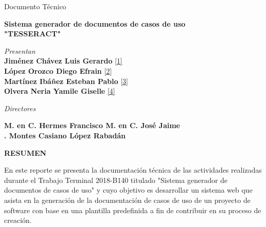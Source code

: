 \documentclass[12pt]{report}
\begin{document}
\begin{center}
	\begin{normalsize}
		Documento Técnico\\
	\end{normalsize}
	\vspace*{0.2in}	
	\begin{large}
		\textbf {Sistema generador de documentos de casos de uso\\
			"TESSERACT"}\\
	\end{large}
	\vspace*{0.2in}
	\begin{large}	
		\textit {Presentan}\\
		\textbf {Jiménez Chávez Luis Gerardo} \hyperlink{x01}{[1]}\\
		\textbf {López Orozco Diego Efrain} \hyperlink{x02}{[2]}\\
		\textbf {Martínez Ibáñez Esteban Pablo} \hyperlink{x03}{[3]}\\
		\textbf {Olvera Neria Yamile Giselle} \hyperlink{x04}{[4]}\\
	\end{large}
	\vspace*{0.3in}
	\begin{large}	
		\textit {Directores}\\
	\end{large}
	
	\begin{normalsize}
		\textbf {M. en C. Hermes Francisco \hspace{5cm} M. en C. José Jaime\\
			.\hspace{0.6cm} Montes Casiano \hspace{6.5cm} López Rabadán }\\
	\end{normalsize}
	\vspace*{0.3in}
	\begin{large}	
	\textbf {RESUMEN}\\
	\end{large}
\end{center}
	\begin{normalsize}
		En este reporte se presenta la documentación técnica de las actividades realizadas durante el Trabajo Terminal 2018-B140 titulado "Sistema generador de documentos de casos de uso" y cuyo objetivo es desarrollar un sistema web que asista en la generación de la documentación de casos de uso de un proyecto de software con base en una plantilla predefinida a fin de contribuir en su proceso de creación.\\ 	
	\end{normalsize}
\end{document}
